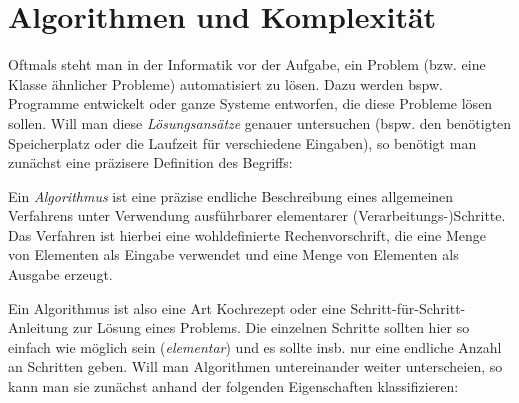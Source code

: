 \section{Algorithmen und Komplexität}
Oftmals steht man in der Informatik vor der Aufgabe, ein Problem (bzw. eine Klasse ähnlicher Probleme) automatisiert zu lösen. Dazu werden bspw. Programme entwickelt oder ganze Systeme entworfen, die diese Probleme lösen sollen. Will man diese \emph{Lösungsansätze} genauer untersuchen (bspw. den benötigten Speicherplatz oder die Laufzeit für verschiedene Eingaben), so benötigt man zunächst eine präzisere Definition des Begriffs:
\begin{defi}
	Ein \emph{Algorithmus} ist eine präzise endliche Beschreibung eines allgemeinen Verfahrens unter Verwendung ausführbarer elementarer (Verarbeitungs-)Schritte. Das Verfahren ist hierbei eine wohldefinierte Rechenvorschrift, die eine Menge von Elementen als Eingabe verwendet und eine Menge von Elementen als Ausgabe erzeugt.
\end{defi}
Ein Algorithmus ist also eine Art Kochrezept oder eine Schritt-für-Schritt-Anleitung zur Lösung eines Problems. Die einzelnen Schritte sollten hier so einfach wie möglich sein (\emph{elementar}) und es sollte insb. nur eine endliche Anzahl an Schritten geben.
Will man Algorithmen untereinander weiter unterscheien, so kann man sie zunächst anhand der folgenden Eigenschaften klassifizieren:
